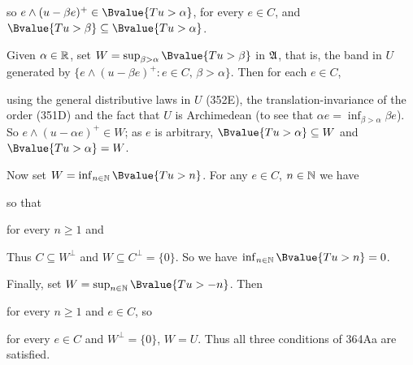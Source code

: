 {

\noindent so $e\wedge(u-\beta e)^+\in\Bvalue{Tu>\alpha}$, for every
$e\in C$, and $\Bvalue{Tu>\beta}\subseteq\Bvalue{Tu>\alpha}$.

\medskip

 Given
$\alpha\in\Bbb R$, set $W=\sup_{\beta>\alpha}\Bvalue{Tu>\beta}$ in
$\frak A$, that is, the band in $U$ generated by
$\{e\wedge(u-\beta e)^+:e\in C,\,\beta>\alpha\}$.   Then for each
$e\in C$,


\noindent using the general distributive laws in $U$ (352E), the
translation-invariance of the order (351D) and the fact that $U$ is
Archimedean (to see that $\alpha e=\inf_{\beta>\alpha}\beta e$).   So
$e\wedge(u-\alpha e)^+\in W$;  as $e$ is arbitrary,
$\Bvalue{Tu>\alpha}\subseteq W$ and $\Bvalue{Tu>\alpha}=W$.

\medskip

 Now set $W=\inf_{n\in\Bbb N}\Bvalue{Tu>n}$.   For any
$e\in C$, $n\in\Bbb N$ we have


\noindent so that


\noindent for every $n\ge 1$ and


\noindent Thus $C\subseteq W^{\perp}$ and $W\subseteq C^{\perp}=\{0\}$.
So we have $\inf_{n\in\Bbb N}\Bvalue{Tu>n}=0$.

\medskip

 Finally, set
$W=\sup_{n\in\Bbb N}\Bvalue{Tu>-n}$.   Then


\noindent for every $n\ge 1$ and $e\in C$, so


\noindent for every $e\in C$ and $W^{\perp}=\{0\}$, $W=U$.   Thus all
three conditions of 364Aa are satisfied.\ \Qed

\medskip

}
